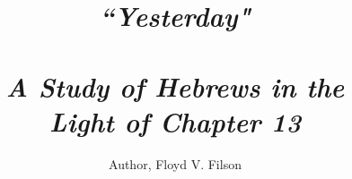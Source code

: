 \documentclass{book}
\author{
  Author, Floyd V. Filson\\
}
\begin{document}
\title{\centering \textit{\textbf{\Huge ``Yesterday"}\\ ~ \\
                          { A Study of Hebrews in the}\\
                          { Light of Chapter 13}}}
\date{}
\maketitle

\LARGE
\end{document}

